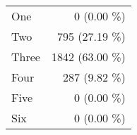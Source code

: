 \begin{tabular}{ l  r }
One & 0 (0.00 \%)\\
Two & 795 (27.19 \%)\\
Three & 1842 (63.00 \%)\\
Four & 287 (9.82 \%)\\
Five & 0 (0.00 \%)\\
Six & 0 (0.00 \%)\\
\end{tabular}